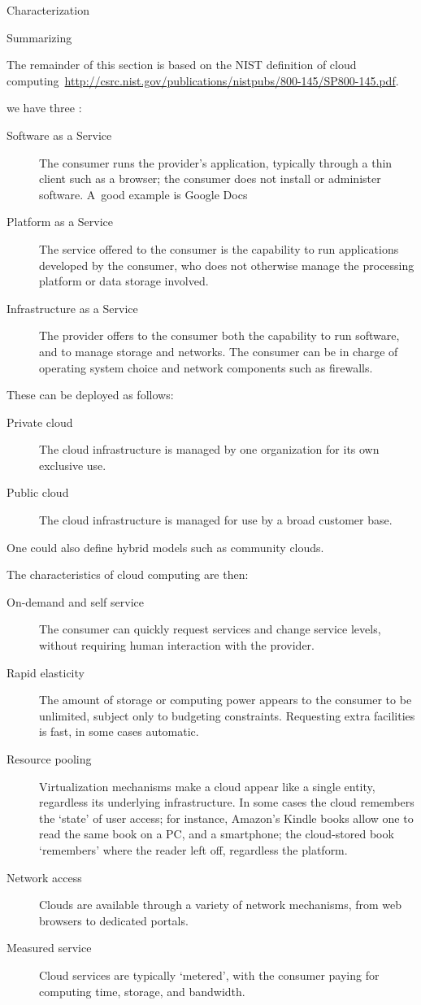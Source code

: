  {Characterization}

Summarizing
\begin{footnoteenv}
  {The remainder of this section is based on the
  NIST definition of cloud
  computing~\url{http://csrc.nist.gov/publications/nistpubs/800-145/SP800-145.pdf}.}
\end{footnoteenv}
we have three :
\begin{description}
  \item[Software as a Service] The consumer runs the provider's
    application, typically through a thin client such as a browser;
    the consumer does not install or administer software.
    A~good example is Google Docs
\item[Platform as a Service] The service offered to the consumer is
  the capability to run applications developed by the consumer, who
  does not otherwise manage the processing platform or data storage
  involved.
\item[Infrastructure as a Service] The provider offers to the consumer
  both the capability to run software, and to manage storage and
  networks. The consumer can be in charge of operating system choice
  and network components such as firewalls.
\end{description}
These can be deployed as follows:
\begin{description}
  \item[Private cloud] The cloud infrastructure is managed by one organization for its own exclusive use.
  \item[Public cloud] The cloud infrastructure is managed for use by a broad customer base.
\end{description}
One could also define hybrid models such as community clouds.

The characteristics of cloud computing are then:
\begin{description}
  \item[On-demand and self service] The consumer can quickly request services
    and change service levels, without requiring human interaction with the provider.
  \item[Rapid elasticity] The amount of storage or computing power appears to the consumer
    to be unlimited, subject only to budgeting constraints. Requesting extra facilities
    is fast, in some cases automatic.
  \item[Resource pooling] Virtualization mechanisms make a cloud
    appear like a single entity, regardless its underlying
    infrastructure. In some cases the cloud remembers the `state' of
    user access; for instance, Amazon's Kindle books allow one to read
    the same book on a PC, and a smartphone; the cloud-stored book
    `remembers' where the reader left off, regardless the platform.
  \item[Network access] Clouds are available through a variety of
    network mechanisms, from web browsers to dedicated portals.
  \item[Measured service] Cloud services are typically `metered', with the consumer
    paying for computing time, storage, and bandwidth.
\end{description}


